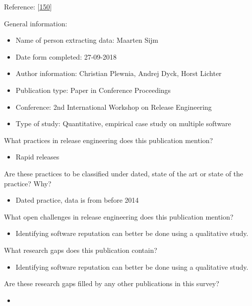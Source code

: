 \documentclass[]{book}
\providecommand{\tightlist}{%
  \setlength{\itemsep}{0pt}\setlength{\parskip}{0pt}}
\begin{document}
Reference: {[}\protect\hyperlink{ref-plewnia2014a}{150}{]}

General information:

\begin{itemize}
\tightlist
\item
  Name of person extracting data: Maarten Sijm
\item
  Date form completed: 27-09-2018
\item
  Author information: Christian Plewnia, Andrej Dyck, Horst Lichter
\item
  Publication type: Paper in Conference Proceedings
\item
  Conference: 2nd International Workshop on Release Engineering
\item
  Type of study: Quantitative, empirical case study on multiple software
\end{itemize}

What practices in release engineering does this publication mention?

\begin{itemize}
\tightlist
\item
  Rapid releases
\end{itemize}

Are these practices to be classified under dated, state of the art or
state of the practice? Why?

\begin{itemize}
\tightlist
\item
  Dated practice, data is from before 2014
\end{itemize}

What open challenges in release engineering does this publication
mention?

\begin{itemize}
\tightlist
\item
  Identifying software reputation can better be done using a qualitative
  study.
\end{itemize}

What research gaps does this publication contain?

\begin{itemize}
\tightlist
\item
  Identifying software reputation can better be done using a qualitative
  study.
\end{itemize}

Are these research gaps filled by any other publications in this survey?

\begin{itemize}
\item
\end{itemize}
\end{document}
